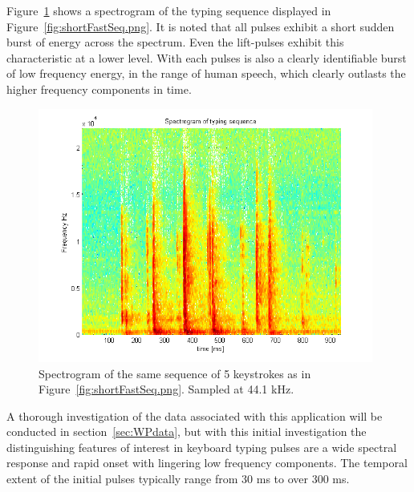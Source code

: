 Figure~\ref{fig:shortFastSeqSpec.png} shows a spectrogram of the typing sequence displayed in Figure~\ref{fig:shortFastSeq.png}. It is noted that all pulses exhibit a short sudden burst of energy across the spectrum. Even the lift-pulses exhibit this characteristic at a lower level. With each pulses is also a clearly identifiable burst of low frequency energy, in the range of human speech, which clearly outlasts the higher frequency components in time.

\begin{figure}
  \begin{center}
    \includegraphics[width=110mm]{shortFastSeqSpec.png}
    \caption{Spectrogram of the same sequence of 5 keystrokes as in Figure~\ref{fig:shortFastSeq.png}. Sampled at 44.1 kHz.}\label{fig:shortFastSeqSpec.png}
  \end{center}
\end{figure}

A thorough investigation of the data associated with this application will be conducted in section~\ref{sec:WPdata}, but with this initial investigation the distinguishing features of interest in keyboard typing pulses are a wide spectral response and rapid onset with lingering low frequency components. The temporal extent of the initial pulses typically range from 30 ms to over 300 ms.


